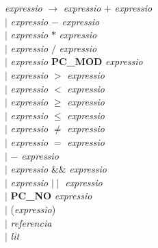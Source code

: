 \documentclass[10pt]{report}
\begin{document}
\begin{tabbing}
        \textit{expressio} \> $\rightarrow$ \> \textit{expressio} $ + $ \textit{expressio} \\
        \> $\mid$ \> \textit{expressio} $ - $ \textit{expressio} \\
        \> $\mid$ \> \textit{expressio} $ * $ \textit{expressio} \\
        \> $\mid$ \> \textit{expressio} $ / $ \textit{expressio} \\
        \> $\mid$ \> \textit{expressio} \textbf{PC\_MOD} \textit{expressio} \\
        \> $\mid$ \> \textit{expressio} $ > $ \textit{expressio} \\
        \> $\mid$ \> \textit{expressio} $ < $ \textit{expressio} \\
        \> $\mid$ \> \textit{expressio} $ \geq $ \textit{expressio} \\
        \> $\mid$ \> \textit{expressio} $ \leq $ \textit{expressio} \\
        \> $\mid$ \> \textit{expressio} $ \neq $ \textit{expressio} \\
        \> $\mid$ \> \textit{expressio} $ = $ \textit{expressio} \\
        \> $\mid$ \> $-$ \textit{expressio} \\
        \> $\mid$ \> \textit{expressio} \&\& \textit{expressio} \\
        \> $\mid$ \> \textit{expressio} $\mid\mid$ \textit{expressio} \\
        \> $\mid$ \> \textbf{PC\_NO} \textit{expressio} \\
        \> $\mid$ \> (\textit{expressio}) \\
        \> $\mid$ \> \textit{referencia} \\
        \> $\mid$ \> \textit{lit} \\
    \end{tabbing}
    
\end{document}
